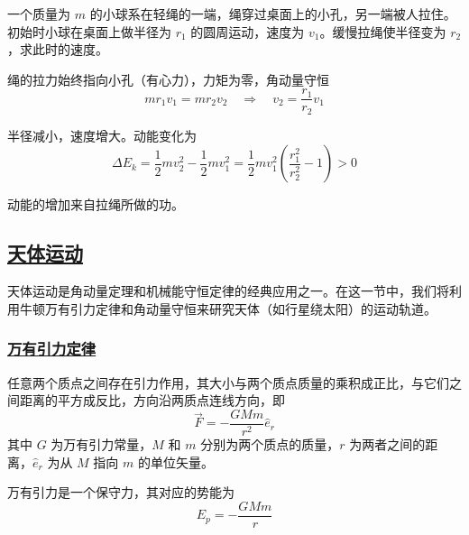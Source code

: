 \begin{example}
    一个质量为 $m$ 的小球系在轻绳的一端，绳穿过桌面上的小孔，另一端被人拉住。初始时小球在桌面上做半径为 $r_1$ 的圆周运动，速度为 $v_1$。缓慢拉绳使半径变为 $r_2$，求此时的速度。
    \begin{solution}
        绳的拉力始终指向小孔（有心力），力矩为零，角动量守恒
        \begin{equation}
            mr_1 v_1 = mr_2 v_2 \quad \Longrightarrow \quad v_2 = \frac{r_1}{r_2}v_1
        \end{equation}
        
        半径减小，速度增大。动能变化为
        \begin{equation}
            \Delta E_k = \frac{1}{2}mv_2^2 - \frac{1}{2}mv_1^2 = \frac{1}{2}mv_1^2\left(\frac{r_1^2}{r_2^2} - 1\right) > 0
        \end{equation}
        
        动能的增加来自拉绳所做的功。
    \end{solution}
\end{example}

\subsection{\protect\hyperlink{:}{天体运动}}

天体运动是角动量定理和机械能守恒定律的经典应用之一。在这一节中，我们将利用牛顿万有引力定律和角动量守恒来研究天体（如行星绕太阳）的运动轨道。

\subsubsection{\protect\hyperlink{:}{万有引力定律}}

\begin{theorem}[万有引力定律]
    任意两个质点之间存在引力作用，其大小与两个质点质量的乘积成正比，与它们之间距离的平方成反比，方向沿两质点连线方向，即
    \begin{equation}
        \vec{F} = -\frac{GMm}{r^2}\hat{e}_r
    \end{equation}
    其中 $G$ 为万有引力常量，$M$ 和 $m$ 分别为两个质点的质量，$r$ 为两者之间的距离，$\hat{e}_r$ 为从 $M$ 指向 $m$ 的单位矢量。
\end{theorem}

万有引力是一个保守力，其对应的势能为
\begin{equation}
    E_p = -\frac{GMm}{r}
\end{equation}

